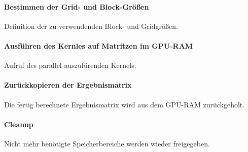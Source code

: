 \paragraph{Bestimmen der Grid- und Block-Größen}
Definition der zu verwendenden Block- und Gridgrößen. 
\label{lst:a6-init}

\label{lst:a6-init}



\paragraph{Ausführen des Kernles auf Matritzen im GPU-RAM}
Aufruf des parallel auszufürenden Kernels.
\label{lst:a6-init}


\paragraph{Zurückkopieren der Ergebnismatrix}
Die fertig berechnete Ergebnismatrix wird aus dem GPU-RAM zurückgeholt.
\label{lst:a6-init}


\paragraph{Cleanup}
Nicht mehr benötigte Speicherbereiche werden wieder freigegeben.
\label{lst:a6-init}

